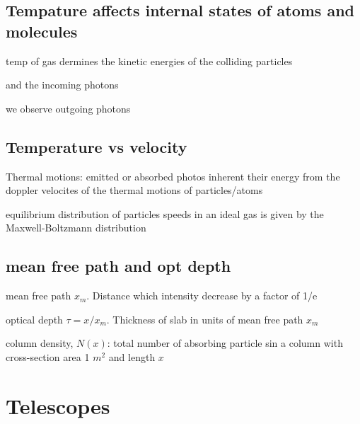 \documentclass{article}
\begin{document}
\subsection{Tempature affects internal states of atoms and molecules}
\begin{list}{-}{}
\item temp of gas dermines the kinetic energies of the colliding particles
\item and the incoming photons
\item we observe outgoing photons
\end{list}

\subsection{Temperature vs velocity}
\begin{list}{-}{}
\item Thermal motions: emitted or absorbed photos inherent their energy from the doppler velocites of the thermal motions of particles/atoms
\item equilibrium distribution of particles speeds in an ideal gas is given by the Maxwell-Boltzmann distribution
\end{list}

\subsection{mean free path and opt depth}

\begin{list}{-}{}
\item mean free path $x_m$. Distance which intensity decrease by a factor of 1/e
\item optical depth $\tau = x/x_m$. Thickness of slab in units of mean free path $x_m$
\item column density, $N(x)$: total number of absorbing particle sin a column with cross-section area 1 $m^2$ and length $x$
\end{list}

\section{Telescopes}
\end{document}
